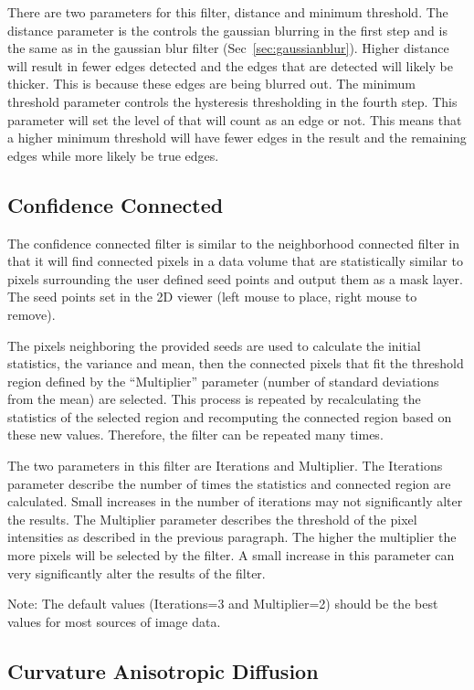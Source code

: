 \documentclass[fleqn,11pt,openany]{book}
\begin{document}
There are two parameters for this filter, distance and minimum threshold.  The distance parameter is the controls the gaussian blurring in the first step and is the same as in the gaussian blur filter (Sec~\ref{sec:gaussianblur}).  Higher distance will result in fewer edges detected and the edges that are detected will likely be thicker.  This is because these edges are being blurred out.  The minimum threshold parameter controls the hysteresis thresholding in the fourth step.  This parameter will set the level of that will count as an edge or not.  This means that a higher minimum threshold will have fewer edges in the result and the remaining edges while more likely be true edges.  

\subsection{Confidence Connected}

The confidence connected filter is similar to the neighborhood connected filter in that it will find connected pixels in a data volume that are statistically similar to pixels surrounding the user defined seed points and output them as a mask layer.  The seed points set in the 2D viewer (left mouse to place, right mouse to remove). 

The pixels neighboring the provided seeds are used to calculate the initial statistics, the variance and mean, then the connected pixels that fit the threshold region defined by the ``Multiplier'' parameter (number of standard deviations from the mean) are selected.  This process is repeated by recalculating the statistics of the selected region and recomputing the connected region based on these new values.  Therefore, the filter can be repeated many times.  

The two parameters in this filter are Iterations and Multiplier.  The Iterations parameter describe the number of times the statistics and connected region are calculated.  Small increases in the number of iterations may not significantly alter the results.  The Multiplier parameter describes the threshold of the pixel intensities as described in the previous paragraph.  The higher the multiplier the more pixels will be selected by the filter.  A small increase in this parameter can very significantly alter the results of the filter.  

Note:  The default values (Iterations=3 and Multiplier=2) should be the best values for most sources of image data.  

\subsection{Curvature Anisotropic Diffusion}
\end{document}
